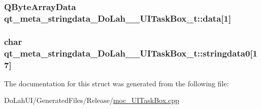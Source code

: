\subsubsection[{data}]{\setlength{\rightskip}{0pt plus 5cm}Q\+Byte\+Array\+Data qt\+\_\+meta\+\_\+stringdata\+\_\+\+Do\+Lah\+\_\+\+\_\+\+U\+I\+Task\+Box\+\_\+t\+::data\mbox{[}1\mbox{]}}\label{structqt__meta__stringdata___do_lah_____u_i_task_box__t_a4602ec97c04eb7890eda1caebc19e022}
\hypertarget{structqt__meta__stringdata___do_lah_____u_i_task_box__t_a5d50b38f4a21565219216ef19a1d314d}{}
\subsubsection[{stringdata0}]{\setlength{\rightskip}{0pt plus 5cm}char qt\+\_\+meta\+\_\+stringdata\+\_\+\+Do\+Lah\+\_\+\+\_\+\+U\+I\+Task\+Box\+\_\+t\+::stringdata0\mbox{[}17\mbox{]}}\label{structqt__meta__stringdata___do_lah_____u_i_task_box__t_a5d50b38f4a21565219216ef19a1d314d}


The documentation for this struct was generated from the following file\+:\begin{DoxyCompactItemize}
\item 
Do\+Lah\+U\+I/\+Generated\+Files/\+Release/\hyperlink{moc___u_i_task_box_8cpp}{moc\+\_\+\+U\+I\+Task\+Box.\+cpp}\end{DoxyCompactItemize}
